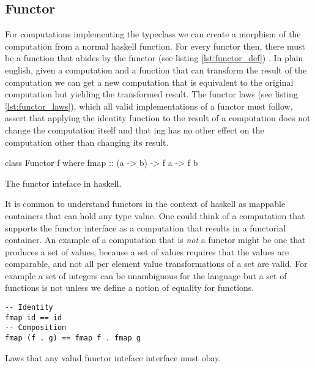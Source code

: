 \subsection{Functor}

For computations implementing the  typeclass we can
create a morphism of the computation from a normal haskell
function. For every functor  then, there must be a function
 that abides by the functor (see
listing \ref{lst:functor_def})
\cite{mcbrideApplicativeProgrammingEffects2008}. In plain english,
given a computation and a function that can transform the result of
the computation we can get a new computation that is equivalent to the
original computation but yielding the transformed result. The functor
laws (see listing \ref{lst:functor_laws}), which all valid
implementations of a functor must follow, assert that applying the
identity function to the result of a computation does not change the
computation itself and that  ing has no other effect on the
computation other than changing its result.
\begin{code}
\begin{haskellcode}
class Functor f where
  fmap :: (a -> b) -> f a -> f b
\end{haskellcode}
\caption{\label{lst:functor_def}The functor inteface in haskell.}
\end{code}

It is common to understand functors in the context of haskell as
mappable containers that can hold any type value. One could think of a
computation that supports the functor interface as a computation that
results in a functorial container. An example of a computation that is
\emph{not} a functor might be one that produces a set of values,
because a set of values requires that the values are comparable, and
not all per element value transformations of a set are valid. For
example a set of integers  can be unambiguous for the
language but a set of functions  is not
unless we define a notion of equality for functions.

\begin{code}
\begin{verbatim}
-- Identity
fmap id == id
-- Composition
fmap (f . g) == fmap f . fmap g
\end{verbatim}
\caption{\label{lst:functor_laws}Laws that any valud functor inteface interface must obay.}
\end{code}


